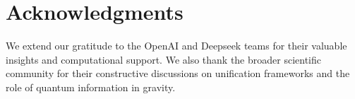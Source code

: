 \documentclass[12pt, a4paper]{article}
\begin{document}
\section*{Acknowledgments}
We extend our gratitude to the OpenAI and Deepseek teams for their valuable insights and computational support. We also thank the broader scientific community for their constructive discussions on unification frameworks and the role of quantum information in gravity.



\end{document}
